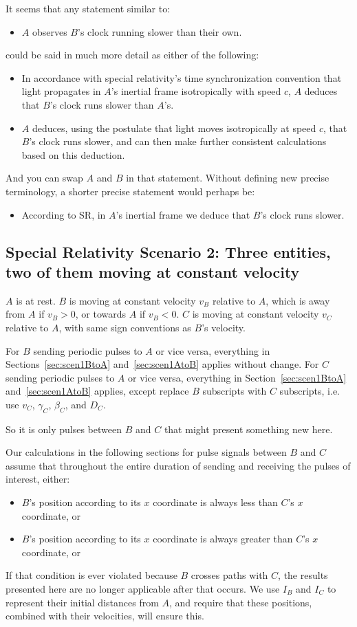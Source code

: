 \documentclass[a4paper]{article}
\theoremstyle{plain}
\theoremstyle{definition}
\begin{document}
It seems that any statement similar to:
\begin{itemize}
\item $A$ observes $B$'s clock running slower than their own.
\end{itemize}
could be said in much more detail as either of the following:
\begin{itemize}
\item In accordance with special relativity's time synchronization
  convention that light propagates in $A$'s inertial frame
  isotropically with speed $c$, $A$ deduces that $B$'s clock runs
  slower than $A$'s.
\item $A$ deduces, using the postulate that light moves isotropically
  at speed $c$, that $B$’s clock runs slower, and can then make
  further consistent calculations based on this deduction.
\end{itemize}
And you can swap $A$ and $B$ in that statement.  Without defining new
precise terminology, a shorter precise statement would perhaps be:
\begin{itemize}
\item According to SR, in $A$'s inertial frame we deduce that $B$'s
  clock runs slower.
\end{itemize}


\subsection{Special Relativity Scenario 2: Three entities, two of them moving at constant velocity}
\label{sec:scen2}

$A$ is at rest.
$B$ is moving at constant velocity $v_B$ relative to $A$,
which is away from $A$ if $v_B > 0$, or towards $A$ if $v_B < 0$.
$C$ is moving at constant velocity $v_C$ relative to $A$,
with same sign conventions as $B$'s velocity.

For $B$ sending periodic pulses to $A$ or vice versa, everything in
Sections~\ref{sec:scen1BtoA} and~\ref{sec:scen1AtoB} applies without
change.
For $C$ sending periodic pulses to $A$ or vice versa, everything in
Section~\ref{sec:scen1BtoA} and~\ref{sec:scen1AtoB} applies,
except replace $B$ subscripts
with $C$ subscripts, i.e. use $v_C$, $\gamma_C$, $\beta_C$, and $D_C$.

So it is only pulses between $B$ and $C$ that might present something
new here.

Our calculations in the following sections for pulse signals between
$B$ and $C$ assume that throughout the entire duration of sending and
receiving the pulses of interest, either:
\begin{itemize}
\item $B$'s position according to its $x$ coordinate is always less
  than $C$'s $x$ coordinate, or
\item $B$'s position according to its $x$ coordinate is always greater
  than $C$'s $x$ coordinate, or
\end{itemize}
If that condition is ever violated because $B$ crosses paths with $C$,
the results presented here are no longer applicable after that occurs.
We use $I_B$ and $I_C$ to represent their initial distances from $A$,
and require that these positions, combined with their velocities, will
ensure this.
\end{document}
